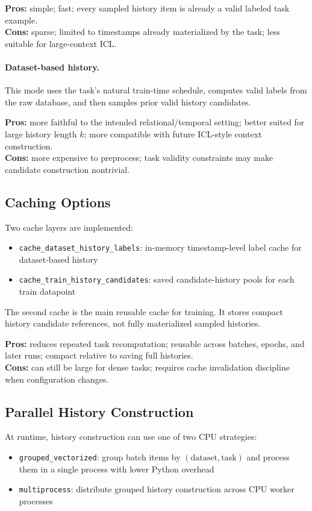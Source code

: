 \documentclass[11pt]{article}
\begin{document}
\textbf{Pros:} simple; fast; every sampled history item is already a valid labeled task example.\\
\textbf{Cons:} sparse; limited to timestamps already materialized by the task; less suitable for large-context ICL.

\paragraph{Dataset-based history.}
This mode uses the task's natural train-time schedule, computes valid labels from the raw database, and then samples prior valid history candidates.

\textbf{Pros:} more faithful to the intended relational/temporal setting; better suited for large history length $k$; more compatible with future ICL-style context construction.\\
\textbf{Cons:} more expensive to preprocess; task validity constraints may make candidate construction nontrivial.

\subsection{Caching Options}

Two cache layers are implemented:
\begin{itemize}
\item \texttt{cache\_dataset\_history\_labels}: in-memory timestamp-level label cache for dataset-based history
\item \texttt{cache\_train\_history\_candidates}: saved candidate-history pools for each train datapoint
\end{itemize}

The second cache is the main reusable cache for training. It stores compact history candidate references, not fully materialized sampled histories.

\textbf{Pros:} reduces repeated task recomputation; reusable across batches, epochs, and later runs; compact relative to saving full histories.\\
\textbf{Cons:} can still be large for dense tasks; requires cache invalidation discipline when configuration changes.

\subsection{Parallel History Construction}

At runtime, history construction can use one of two CPU strategies:
\begin{itemize}
\item \texttt{grouped\_vectorized}: group batch items by $(\text{dataset}, \text{task})$ and process them in a single process with lower Python overhead
\item \texttt{multiprocess}: distribute grouped history construction across CPU worker processes
\end{itemize}
\end{document}
